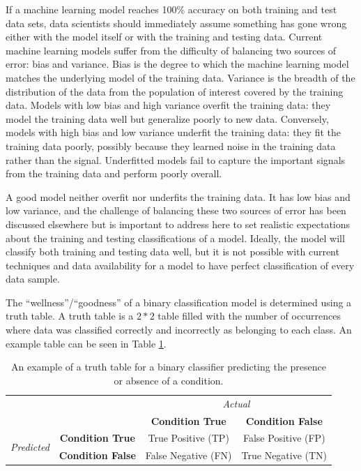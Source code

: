 If a machine learning model reaches 100\% accuracy on both training and test data sets, data scientists should immediately assume something has gone wrong either with the model itself or with the training and testing data. Current machine learning models suffer from the difficulty of balancing two sources of error: bias and variance. Bias is the degree to which the machine learning model matches the underlying model of the training data. Variance is the breadth of the distribution of the data from the population of interest covered by the training data. Models with low bias and high variance overfit the training data: they model the training data well but generalize poorly to new data. Conversely, models with high bias and low variance underfit the training data: they fit the training data poorly, possibly because they learned noise in the training data rather than the signal. Underfitted models fail to capture the important signals from the training data and perform poorly overall.

A good model neither overfit nor underfits the training data. It has low bias and low variance, and the challenge of balancing these two sources of error has been discussed elsewhere but is important to address here to set realistic expectations about the training and testing classifications of a model. Ideally, the model will classify both training and testing data well, but it is not possible with current techniques and data availability for a model to have perfect classification of every data sample. 

The ``wellness''/``goodness'' of a binary classification model is determined using a truth table. A truth table is a $2*2$ table filled with the number of occurrences where data was classified correctly and incorrectly as belonging to each class. An example table can be seen in Table \ref{ch4:tab:truthtable}.

\begin{table}[]
\caption{An example of a truth table for a binary classifier predicting the presence or absence of a condition.}
\label{ch4:tab:truthtable}
\begin{tabular}{cc|c|c|}
\cline{3-4}
\multicolumn{2}{c}{\multirow{2}{*}{}}                                                & \multicolumn{2}{|c|}{\textit{Actual}}               \\ \cline{3-4} 
\multicolumn{2}{c|}{}                                                                 & \textbf{Condition True} & \textbf{Condition False} \\ \hline
\multicolumn{1}{|c|}{\multirow{2}{*}{\textit{Predicted}}} & \textbf{Condition True}  & True Positive (TP)      & False Positive (FP)      \\ \cline{2-4} 
\multicolumn{1}{|c|}{}                                    & \textbf{Condition False} & False Negative (FN)     & True Negative (TN)       \\ \hline
\end{tabular}
\end{table}

